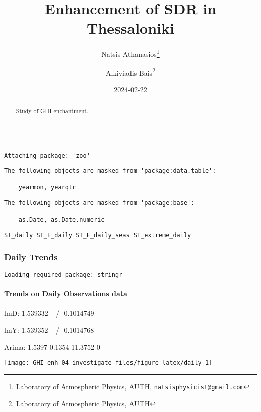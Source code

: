 \documentclass[
  10pt,
  a4paper,oneside]{article}
\title{Enhancement of SDR in Thessaloniki}
\author{Natsis Athanasios\footnote{Laboratory of Atmospheric Physics, AUTH, \href{mailto:natsisphysicist@gmail.com}{\nolinkurl{natsisphysicist@gmail.com}}} \and Alkiviadis Bais\footnote{Laboratory of Atmospheric Physics, AUTH}}
\date{2024-02-22}
\begin{document}
\maketitle
\begin{abstract}
Study of GHI enchantment.
\end{abstract}

{
\hypersetup{linkcolor=}
\setcounter{tocdepth}{4}
\tableofcontents
}
\begin{verbatim}

Attaching package: 'zoo'
\end{verbatim}

\begin{verbatim}
The following objects are masked from 'package:data.table':

    yearmon, yearqtr
\end{verbatim}

\begin{verbatim}
The following objects are masked from 'package:base':

    as.Date, as.Date.numeric
\end{verbatim}

\begin{verbatim}
ST_daily ST_E_daily ST_E_daily_seas ST_extreme_daily
\end{verbatim}

\newpage
\FloatBarrier

\hypertarget{daily-trends}{%
\subsubsection{Daily Trends}\label{daily-trends}}

\newpage

\begin{verbatim}
Loading required package: stringr
\end{verbatim}

\hypertarget{trends-on-daily-observations-data}{%
\paragraph{Trends on Daily Observations data}\label{trends-on-daily-observations-data}}

lmD: 1.539332 +/- 0.1014749

lmY: 1.539352 +/- 0.1014768

Arima: 1.5397 0.1354 11.3752 0

\begin{center}\texttt{[image: GHI\_enh\_04\_investigate\_files/figure-latex/daily-1]} \end{center}
\end{document}
